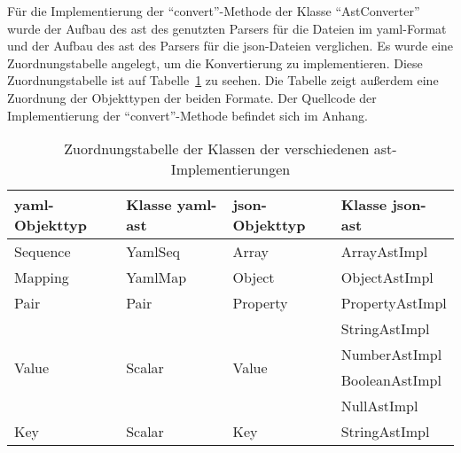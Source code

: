 Für die Implementierung der ``convert''-Methode der Klasse ``AstConverter'' wurde der Aufbau des \ac{ast} des genutzten Parsers für
die Dateien im \ac{yaml}-Format und der Aufbau des \ac{ast} des Parsers für die \ac{json}-Dateien verglichen.
Es wurde eine Zuordnungstabelle angelegt, um die Konvertierung zu implementieren.
Diese Zuordnungstabelle ist auf Tabelle~\ref{tbl:yaml-ast-to-json-ast-convert} zu seehen.
Die Tabelle zeigt außerdem eine Zuordnung der Objekttypen der beiden Formate.
Der Quellcode der Implementierung der  ``convert''-Methode befindet sich im Anhang.

\begin{table}[htp]
      \centering
      \begin{tabular}{|l|l|l|l|}
            \hline
            \acs{yaml}-Objekttyp   & Klasse \acs{yaml}-\acs{ast} & \acs{json}-Objekttyp   & Klasse \acs{json}-\acs{ast} \\
            \hline
            \hline
            Sequence               & YamlSeq                     & Array                  & ArrayAstImpl                \\
            \hline
            Mapping                & YamlMap                     & Object                 & ObjectAstImpl               \\
            \hline
            Pair                   & Pair                        & Property               & PropertyAstImpl             \\
            \hline
            \multirow{4}{*}{Value} & \multirow{4}{*}{Scalar}     & \multirow{4}{*}{Value} & StringAstImpl               \\
                                   &                             &                        & NumberAstImpl               \\
                                   &                             &                        & BooleanAstImpl              \\
                                   &                             &                        & NullAstImpl                 \\
            \hline
            Key                    & Scalar                      & Key                    & StringAstImpl               \\
            \hline
      \end{tabular}
      \caption{Zuordnungstabelle der Klassen der verschiedenen \acs{ast}-Implementierungen}
      \label{tbl:yaml-ast-to-json-ast-convert}
\end{table}

